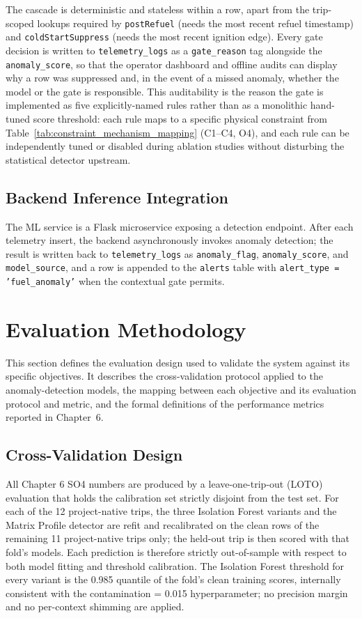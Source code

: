 The cascade is deterministic and stateless within a row, apart from the trip-scoped lookups required by \texttt{postRefuel} (needs the most recent refuel timestamp) and \texttt{coldStartSuppress} (needs the most recent ignition edge). Every gate decision is written to \texttt{telemetry\_logs} as a \texttt{gate\_reason} tag alongside the \texttt{anomaly\_score}, so that the operator dashboard and offline audits can display why a row was suppressed and, in the event of a missed anomaly, whether the model or the gate is responsible. This auditability is the reason the gate is implemented as five explicitly-named rules rather than as a monolithic hand-tuned score threshold: each rule maps to a specific physical constraint from Table~\ref{tab:constraint_mechanism_mapping} (C1--C4, O4), and each rule can be independently tuned or disabled during ablation studies without disturbing the statistical detector upstream.

\subsection{Backend Inference Integration}
The ML service is a Flask microservice exposing a detection endpoint. After each telemetry insert, the backend asynchronously invokes anomaly detection; the result is written back to \texttt{telemetry\_logs} as \texttt{anomaly\_flag}, \texttt{anomaly\_score}, and \texttt{model\_\allowbreak source}, and a row is appended to the \texttt{alerts} table with \texttt{alert\_type = 'fuel\_\allowbreak anomaly'} when the contextual gate permits.

\section{Evaluation Methodology}
\label{sec:evaluation}

This section defines the evaluation design used to validate the system against its specific objectives. It describes the cross-validation protocol applied to the anomaly-detection models, the mapping between each objective and its evaluation protocol and metric, and the formal definitions of the performance metrics reported in Chapter~6.

\subsection{Cross-Validation Design}

All Chapter 6 SO4 numbers are produced by a leave-one-trip-out (LOTO) evaluation that holds the calibration set strictly disjoint from the test set. For each of the 12 project-native trips, the three Isolation Forest variants and the Matrix Profile detector are refit and recalibrated on the clean rows of the remaining 11 project-native trips only; the held-out trip is then scored with that fold's models. Each prediction is therefore strictly out-of-sample with respect to both model fitting and threshold calibration. The Isolation Forest threshold for every variant is the 0.985 quantile of the fold's clean training scores, internally consistent with the contamination = 0.015 hyperparameter; no precision margin and no per-context shimming are applied.

